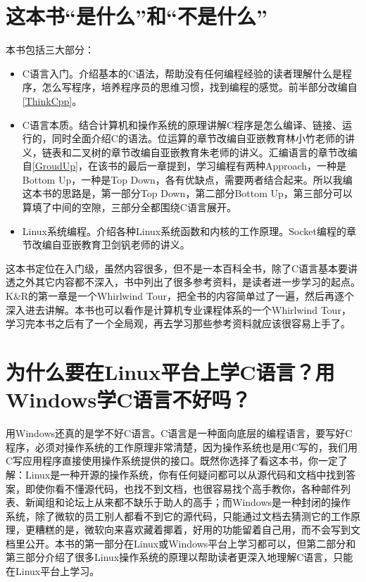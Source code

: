 \section*{这本书“是什么”和“不是什么”}
%


本书包括三大部分：


\begin{itemize}

\item C语言入门。介绍基本的C语法，帮助没有任何编程经验的读者理解什么是程序，怎么写程序，培养程序员的思维习惯，找到编程的感觉。前半部分改编自\hyperlink{db.bi01.bibli.thinkcpp}{[ThinkCpp]}。

\item C语言本质。结合计算机和操作系统的原理讲解C程序是怎么编译、链接、运行的，同时全面介绍C的语法。位运算的章节改编自亚嵌教育林小竹老师的讲义，链表和二叉树的章节改编自亚嵌教育朱老师的讲义。汇编语言的章节改编自\hyperlink{db.bi01.bibli.groundup}{[GroudUp]}，在该书的最后一章提到，学习编程有两种Approach，一种是Bottom Up，一种是Top Down，各有优缺点，需要两者结合起来。所以我编这本书的思路是，第一部分Top Down，第二部分Bottom Up，第三部分可以算填了中间的空隙，三部分全都围绕C语言展开。

\item Linux系统编程。介绍各种Linux系统函数和内核的工作原理。Socket编程的章节改编自亚嵌教育卫剑钒老师的讲义。
\end{itemize}


这本书定位在入门级，虽然内容很多，但不是一本百科全书，除了C语言基本要讲透之外其它内容都不深入，书中列出了很多参考资料，是读者进一步学习的起点。K\&R的第一章是一个Whirlwind Tour，把全书的内容简单过了一遍，然后再逐个深入进去讲解。本书也可以看作是计算机专业课程体系的一个Whirlwind Tour，学习完本书之后有了一个全局观，再去学习那些参考资料就应该很容易上手了。


\section*{为什么要在Linux平台上学C语言？用Windows学C语言不好吗？}
%


用Windows还真的是学不好C语言。C语言是一种面向底层的编程语言，要写好C程序，必须对操作系统的工作原理非常清楚，因为操作系统也是用C写的，我们用C写应用程序直接使用操作系统提供的接口。既然你选择了看这本书，你一定了解：Linux是一种开源的操作系统，你有任何疑问都可以从源代码和文档中找到答案，即使你看不懂源代码，也找不到文档，也很容易找个高手教你，各种邮件列表、新闻组和论坛上从来都不缺乐于助人的高手；而Windows是一种封闭的操作系统，除了微软的员工别人都看不到它的源代码，只能通过文档去猜测它的工作原理，更糟糕的是，微软向来喜欢藏着揶着，好用的功能留着自己用，而不会写到文档里公开。本书的第一部分在Linux或Windows平台上学习都可以，但第二部分和第三部分介绍了很多Linux操作系统的原理以帮助读者更深入地理解C语言，只能在Linux平台上学习。



